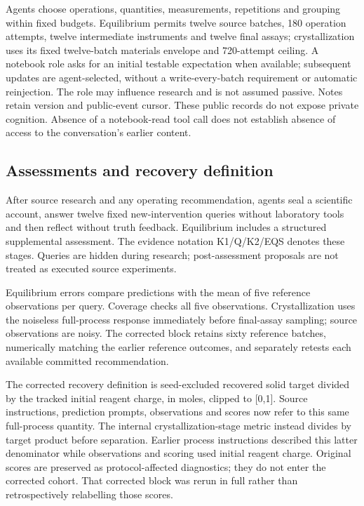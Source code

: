 \documentclass[12pt,a4paper]{article}
\begin{document}
Agents choose operations, quantities, measurements, repetitions and grouping within fixed budgets. Equilibrium permits twelve source batches, 180 operation attempts, twelve intermediate instruments and twelve final assays; crystallization uses its fixed twelve-batch materials envelope and 720-attempt ceiling. A notebook role asks for an initial testable expectation when available; subsequent updates are agent-selected, without a write-every-batch requirement or automatic reinjection. The role may influence research and is not assumed passive. Notes retain version and public-event cursor. These public records do not expose private cognition. Absence of a notebook-read tool call does not establish absence of access to the conversation's earlier content.

\subsection{Assessments and recovery definition}\label{assessments-and-recovery-definition}

After source research and any operating recommendation, agents seal a scientific account, answer twelve fixed new-intervention queries without laboratory tools and then reflect without truth feedback. Equilibrium includes a structured supplemental assessment. The evidence notation K1/Q/K2/EQS denotes these stages. Queries are hidden during research; post-assessment proposals are not treated as executed source experiments.

Equilibrium errors compare predictions with the mean of five reference observations per query. Coverage checks all five observations. Crystallization uses the noiseless full-process response immediately before final-assay sampling; source observations are noisy. The corrected block retains sixty reference batches, numerically matching the earlier reference outcomes, and separately retests each available committed recommendation.

The corrected recovery definition is seed-excluded recovered solid target divided by the tracked initial reagent charge, in moles, clipped to {[}0,1{]}. Source instructions, prediction prompts, observations and scores now refer to this same full-process quantity. The internal crystallization-stage metric instead divides by target product before separation. Earlier process instructions described this latter denominator while observations and scoring used initial reagent charge. Original scores are preserved as protocol-affected diagnostics; they do not enter the corrected cohort. That corrected block was rerun in full rather than retrospectively relabelling those scores.
\end{document}

